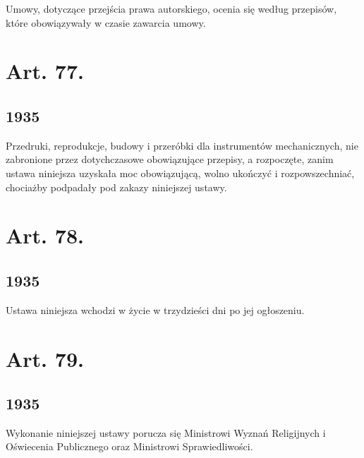 \documentclass[withmarginpar]{book}
\begin{document}
Umowy, dotyczące przejścia prawa autorskiego, ocenia się według
przepisów, które obowiązywały w czasie zawarcia umowy.

\section{Art. 77.}
\label{sec:art.-77}
\subsection{1935}
\label{sec:art.-77-1}

Przedruki, reprodukcje, budowy i przeróbki dla instrumentów
mechanicznych, nie zabronione przez dotychczasowe obowiązujące
przepisy, a rozpoczęte, zanim ustawa niniejsza uzyskała moc
obowiązującą, wolno ukończyć i rozpowszechniać, chociażby podpadały
pod zakazy niniejszej ustawy.

\section{Art. 78.}
\label{sec:art.-78}
\subsection{1935}
\label{sec:art.-78-1}

Ustawa niniejsza wchodzi w życie w trzydzieści dni po jej ogłoszeniu.

\section{Art. 79.}
\label{sec:art.-79}
\subsection{1935}
\label{sec:art.-79-1}

Wykonanie niniejszej ustawy porucza się Ministrowi Wyznań Religijnych
i Oświecenia Publicznego oraz Ministrowi Sprawiedliwości.
\end{document}
